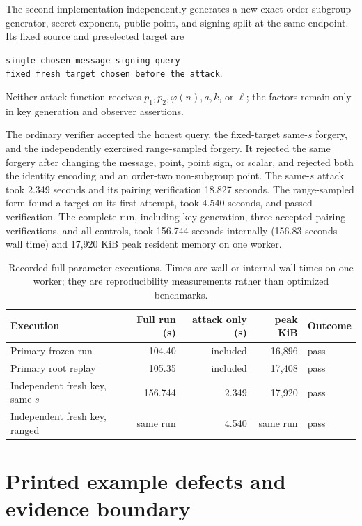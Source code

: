 \documentclass[10pt,a4paper]{article}
\begin{document}
The second implementation independently generates a new exact-order
subgroup generator, secret exponent, public point, and signing split at the
same endpoint.  Its fixed source and preselected target are
\begin{center}
\texttt{single chosen-message signing query}\\
\texttt{fixed fresh target chosen before the attack}.
\end{center}
Neither attack function receives $p_1,p_2,\varphi(n),a,k$, or $\ell$; the
factors remain only in key generation and observer assertions.

The ordinary verifier accepted the honest query, the fixed-target same-$s$
forgery, and the independently exercised range-sampled forgery.  It rejected
the same forgery after changing the message, point, point sign, or scalar, and
rejected both the identity encoding and an order-two non-subgroup point.  The
same-$s$ attack took 2.349 seconds and its pairing verification 18.827
seconds.  The range-sampled form found a target on its first attempt, took
4.540 seconds, and passed verification.  The complete run, including key
generation, three accepted pairing verifications, and all controls, took
156.744 seconds internally (156.83 seconds wall time) and 17,920 KiB peak
resident memory on one worker.

\begin{table}[ht]
\centering
\caption{Recorded full-parameter executions.  Times are wall or internal wall
times on one worker; they are reproducibility measurements rather than
optimized benchmarks.}
\label{tab:runs}
\small
\begin{tabular}{@{}lrrrl@{}}
\toprule
Execution & Full run (s) & attack only (s) & peak KiB & Outcome \\
\midrule
Primary frozen run & 104.40 & included & 16,896 & pass \\
Primary root replay & 105.35 & included & 17,408 & pass \\
Independent fresh key, same-$s$ & 156.744 & 2.349 & 17,920 & pass \\
Independent fresh key, ranged & same run & 4.540 & same run & pass \\
\bottomrule
\end{tabular}
\end{table}

\section{Printed example defects and evidence boundary}
\end{document}
